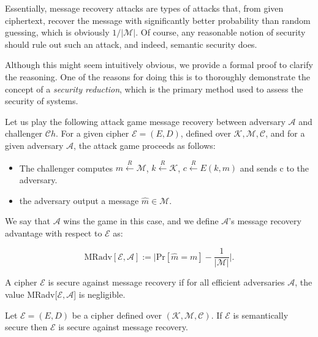 \documentclass[../lecture-notes-148x210.tex]{subfiles}
\begin{document}
Essentially, message recovery attacks \cite[chapter 2]{Dan_Boneh_2023} are types of attacks that, from given ciphertext, recover the message with significantly better probability than random guessing, which is obviously $1/|\mathcal{M}|$.
Of course, any reasonable notion of security should rule out such an attack, and indeed, semantic security does.

Although this might seem intuitively obvious, we provide a formal proof to clarify the reasoning. 
One of the reasons for doing this is to thoroughly demonstrate the concept of a \emph{security reduction}, which is the primary method used to assess the security of systems.

Let us play the following attack game message recovery between adversary $\mathcal{A}$ and challenger $\mathcal{C}h$.
For a given cipher $\mathcal{E} = (E, D)$, defined over $\mathcal{K}, \mathcal{M}, \mathcal{C}$, and for a given adversary $\mathcal{A}$, the attack game proceeds as follows: 

\begin{itemize}
    \item The challenger computes $m \xleftarrow{R} \mathcal{M}$, $k \xleftarrow{R} \mathcal{K}$, $c \xleftarrow{R} E(k, m)$ and sends c to the adversary.
    \item the adversary output a message $\hat{m} \in \mathcal{M}$.
\end{itemize}

We say that $\mathcal{A}$ wins the game in this case, and we define $\mathcal{A}$'s message recovery advantage with respect to $\mathcal{E}$ as:

\begin{equation*}
    \text{MRadv}[\mathcal{E}, \mathcal{A}] := \Bigg|\text{Pr}[\hat{m} = m] - \frac{1}{|\mathcal{M}|}\Bigg|.
\end{equation*}

\begin{definition} 
    A cipher $\mathcal{E}$ is secure against message recovery if for all efficient adversaries $\mathcal{A}$, the value MRadv[$\mathcal{E}, \mathcal{A}$] is negligible.
\end{definition}

\begin{theorem}
    Let $\mathcal{E} = (E, D)$ be a cipher defined over $(\mathcal{K}, \mathcal{M}, \mathcal{C})$. If $\mathcal{E}$ is semantically secure then $\mathcal{E}$ is secure against message recovery.
\end{theorem}
\end{document}
